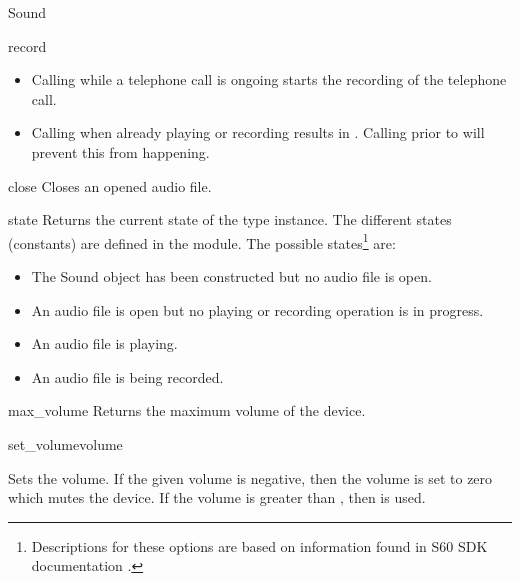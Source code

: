 \begin{classdesc*}{Sound}
\begin{methoddesc}[Sound]{record}{}
\begin{itemize}
\item Calling  while a telephone call is ongoing starts the recording of the telephone call. 
\item Calling  when already playing or recording results in . Calling  prior to  will prevent this from happening.
\end{itemize}
\end{methoddesc}

\begin{methoddesc}[Sound]{close}{}
Closes an opened audio file.
\end{methoddesc}

\begin{methoddesc}[Sound]{state}{}
Returns the current state of the  type instance. The different 
states (constants) are defined in the  module. The possible 
states\footnote{Descriptions for these options are based on information 
found in S60 SDK documentation \cite{S60Doc}.} are:

\begin{itemize}
\item {} \newline
The \textsf{Sound} object has been constructed but no audio file is open.
\item {} \newline
An audio file is open but no playing or recording operation is in progress.
\item {} \newline
An audio file is playing.
\item {} \newline
An audio file is being recorded.
\end{itemize}
\end{methoddesc}

\begin{methoddesc}[Sound]{max_volume}{}
Returns the maximum volume of the device.
\end{methoddesc}

\begin{methoddesc}[Sound]{set_volume}{volume}

Sets the volume. If the given volume is negative, then the volume is set to 
zero which mutes the device. If the volume is greater than , 
then  is used.
\end{methoddesc}


\end{classdesc*}
